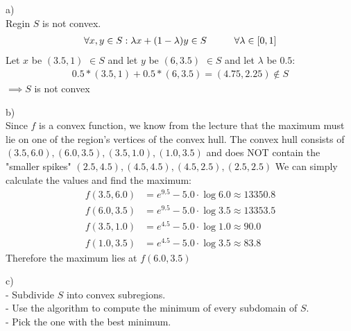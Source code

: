 %
\begin{flushleft}
a)\\
Regin $S$ is not convex.
\begin{align*}
\forall x,y \in S: \lambda x + (1-\lambda)y \in S \hspace{10mm}\forall \lambda \in [0,1]
\end{align*}
Let $x$ be $(3.5,1)$ $\in S$ and let $y$ be $(6,3.5)$ $\in S$ and let $\lambda$ be $0.5$:
\begin{align*}
0.5*(3.5,1) + 0.5*(6,3.5) = (4.75, 2.25) \notin S
\end{align*}
$\implies S$ is not convex
\end{flushleft}
\begin{flushleft}
b)\\
Since $f$ is a convex function, we know from the lecture that the maximum must lie on one of the region's vertices of the convex hull. The convex hull consists of $(3.5,6.0), (6.0,3.5), (3.5,1.0), (1.0,3.5)$ and does NOT contain the "smaller spikes" $(2.5,4.5), (4.5,4.5), (4.5,2.5), (2.5,2.5)$ We can simply calculate the values and find the maximum:
\begin{align*}
  f(3.5,6.0) &= e^{9.5} - 5.0 \cdot \log{6.0} \approx 13350.8 \\
  f(6.0,3.5) &= e^{9.5} - 5.0 \cdot \log{3.5} \approx \mathbf{13353.5} \\
  f(3.5,1.0) &= e^{4.5} - 5.0 \cdot \log{1.0} \approx 90.0 \\
  f(1.0,3.5) &= e^{4.5} - 5.0 \cdot \log{3.5} \approx 83.8
\end{align*}
Therefore the maximum lies at $f(6.0, 3.5)$
\end{flushleft}
\begin{flushleft}
c)\\
- Subdivide $S$ into convex subregions.\\
- Use the algorithm to compute the minimum of every subdomain of $S$.\\
- Pick the one with the best minimum. 
\end{flushleft}
%
%
%
%




